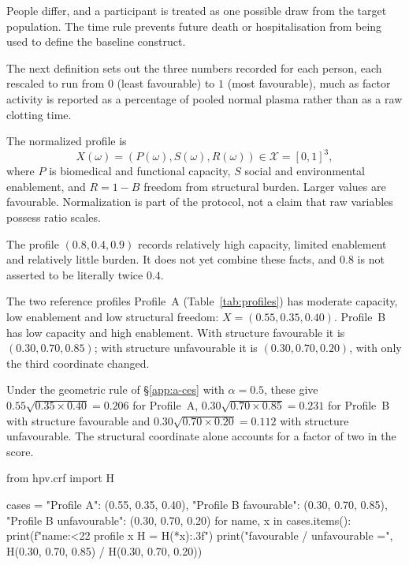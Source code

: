 \begin{remark}
People differ, and a participant is treated as one possible draw from the
target population. The time rule prevents future death or hospitalisation from
being used to define the baseline construct.
\end{remark}

The next definition sets out the three numbers recorded for each person, each
rescaled to run from $0$ (least favourable) to $1$ (most favourable), much as
factor activity is reported as a percentage of pooled normal plasma rather than
as a raw clotting time.

\begin{definition}
The normalized profile is
\[
X(\omega)=(P(\omega),S(\omega),R(\omega))\in\mathcal X=[0,1]^3,
\]
where $P$ is biomedical and functional capacity, $S$ social and environmental
enablement, and $R=1-B$ freedom from structural burden. Larger values are
favourable. Normalization is part of the protocol, not a claim that raw
variables possess ratio scales.
\end{definition}

\begin{remark}
The profile $(0.8,0.4,0.9)$ records relatively high capacity, limited
enablement and relatively little burden. It does not yet combine these facts,
and $0.8$ is not asserted to be literally twice $0.4$.
\end{remark}

\begin{workedexample}{The two reference profiles}
Profile~A (Table~\ref{tab:profiles}) has moderate capacity, low enablement and
low structural freedom: $X=(0.55,0.35,0.40)$. Profile~B has low capacity and
high enablement. With structure favourable it is $(0.30,0.70,0.85)$; with
structure unfavourable it is $(0.30,0.70,0.20)$, with only the third coordinate
changed.

Under the geometric rule of \S\ref{app:a-ces} with $\alpha=0.5$, these give
$0.55\sqrt{0.35\times0.40}=0.206$ for Profile~A, $0.30\sqrt{0.70\times0.85}=0.231$
for Profile~B with structure favourable and $0.30\sqrt{0.70\times0.20}=0.112$
with structure unfavourable. The structural coordinate alone accounts for a
factor of two in the score.

\begin{wecode}[Python]
from hpv.crf import H

cases = {"Profile A": (0.55, 0.35, 0.40),
         "Profile B favourable": (0.30, 0.70, 0.85),
         "Profile B unfavourable": (0.30, 0.70, 0.20)}
for name, x in cases.items():
    print(f"{name:<22} profile {x}  H = {H(*x):.3f}")
print("favourable / unfavourable =", H(0.30, 0.70, 0.85) / H(0.30, 0.70, 0.20))
\end{wecode}

\end{workedexample}

